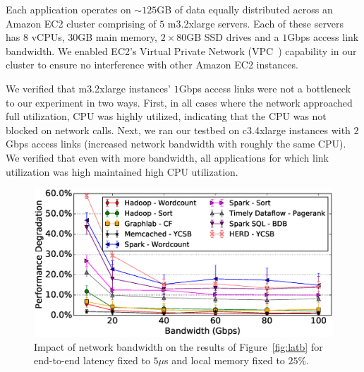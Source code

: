 
%
Each application operates on $\sim125$GB of data equally distributed across an Amazon EC2 cluster comprising of $5$ m3.2xlarge servers. Each of these servers has $8$ vCPUs, $30$GB main memory, $2 \times 80$GB SSD drives and a $1$Gbps access link bandwidth.
We enabled EC2's Virtual Private Network (VPC~\cite{vpc}) capability in our cluster to ensure no interference with other Amazon EC2 instances. 
 
We verified that m3.2xlarge instances' $1$Gbps access links were not a bottleneck to our experiment in two ways. 
First, in all cases where the network approached full utilization, CPU was highly utilized, indicating that the CPU was not blocked on network calls.
Next, we ran our testbed on c3.4xlarge instances with $2$Gbps access links (increased network bandwidth with roughly the same CPU). We verified that even with more bandwidth, all applications for which link utilization was high maintained high CPU utilization.
\begin{figure}[t]
  \centering
    \includegraphics[width = \columnwidth]{img/fix_latency_vary_bw.eps} 
  \caption{\small{Impact of network bandwidth on the results of Figure~\ref{fig:latb} for end-to-end latency fixed to $5\mu$s and local memory fixed to $25\%$.}}%
  \label{fig:impbw}
\end{figure}
%
%
